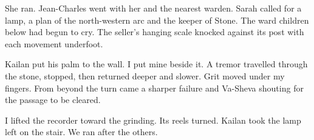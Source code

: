 She ran. Jean-Charles went with her and the nearest warden. Sarah called for a lamp, a plan of the north-western arc and the keeper of Stone. The ward children below had begun to cry. The seller's hanging scale knocked against its post with each movement underfoot.\par

Kailan put his palm to the wall. I put mine beside it. A tremor travelled through the stone, stopped, then returned deeper and slower. Grit moved under my fingers. From beyond the turn came a sharper failure and Va-Sheva shouting for the passage to be cleared.\par

I lifted the recorder toward the grinding. Its reels turned. Kailan took the lamp left on the stair. We ran after the others.\par
